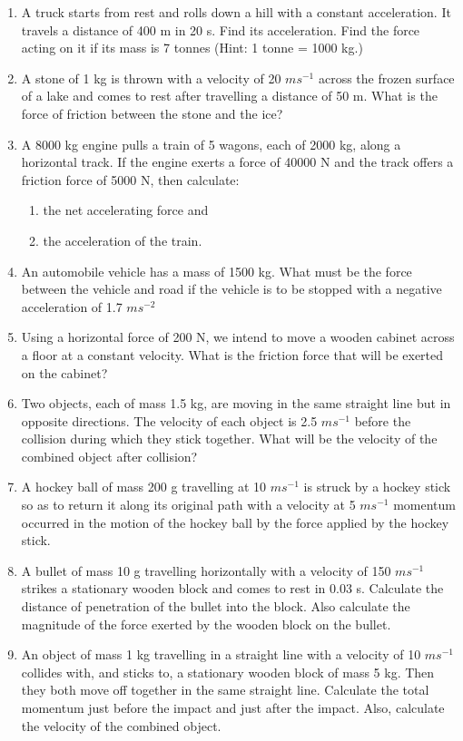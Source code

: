 \begin{enumerate}[label=\arabic*.,ref=\thesection.\theenumi]
\item A truck starts from rest and rolls down a hill with a constant acceleration. It travels a distance of 400 m in 20 s. Find its acceleration. Find the force acting on it if its mass is 7 tonnes (Hint: 1 tonne = 1000 kg.)
\item  A stone of 1 kg is thrown with a velocity of 20 $m s^{-1}$ across
the frozen surface of a lake and comes to rest after travelling a distance of 50 m. What is the force of friction between the stone and the ice?
\item  A 8000 kg engine pulls a train of 5 wagons, each of 2000 kg, along a horizontal track. If the engine exerts a force of 40000 N and the track offers a friction force of 5000 N, then calculate: 
\begin{enumerate} 
\item the net accelerating force and 
\item the acceleration of the train.
\end{enumerate}
\item  An automobile vehicle has a mass of 1500 kg. What must be the force between the vehicle and road if the vehicle is to
be stopped with a negative acceleration of 1.7 $m s^{-2}$ 
\item  Using a horizontal force of 200 N, we intend to move a wooden cabinet across a floor at a constant velocity. What is the friction force that will be exerted on the cabinet?
\item  Two objects, each of mass 1.5 kg, are moving in the same straight line but in opposite directions. The velocity of each object is 2.5 $m s^{-1}$
before the collision during which they stick together. What will be the velocity of the combined object after collision?
\item A hockey ball of mass 200 g travelling at 10 $m s^{-1}$ is struck by
a hockey stick so as to return it along its original path with a velocity at 5 $m s^{-1}$
momentum occurred in the motion of the hockey ball by the force applied by the hockey stick.
\item  A bullet of mass 10 g travelling horizontally with a velocity of 150 $m s^{-1}$
strikes a stationary wooden block and comes to rest in 0.03 s. Calculate the distance of penetration of the bullet into the block. Also calculate the magnitude of the force exerted by the wooden block on the bullet.
\item  An object of mass 1 kg travelling in a straight line with a velocity of 10 $m s^{-1}$
collides with, and sticks to, a stationary wooden block of mass 5 kg. Then they both move off together in the same straight line. Calculate the total momentum just before the impact and just after the impact. Also, calculate the velocity of the combined object.

\end{enumerate}
